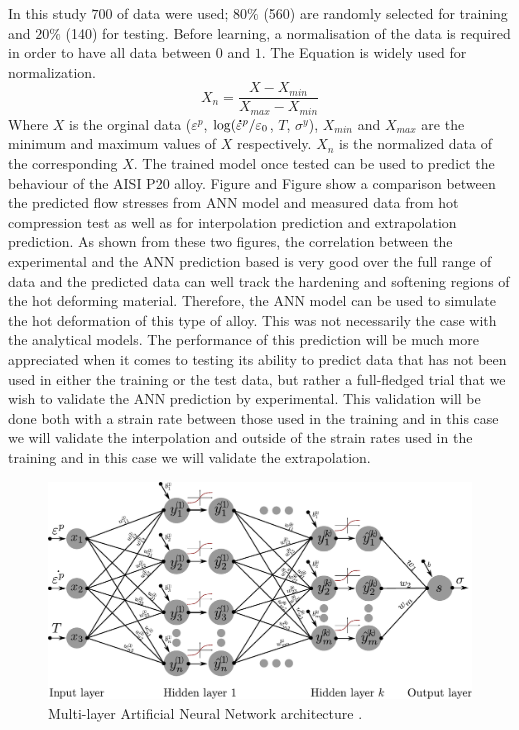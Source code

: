 \documentclass[twoside,english,1p,final,sort&compress]{elsarticle}
\theoremstyle{plain}
\newcommand{\mdot}[1]{\accentset{\mbox{\bfseries .}}{#1}}
\begin{document}
In this study $700$ of data were used; $80\%$ (560) are randomly selected for training and $20\%$ (140) for testing. Before learning, a normalisation of the data is required in order to have all data between $0$ and $1$. The Equation is widely used for normalization.
\begin{equation}
X_n = \frac{X - X_{min}}{X_{max} - X_{min}}
\end{equation}
Where $X$ is the orginal data ($\varepsilon^p$, $\log(\mdot{\varepsilon}^p/\varepsilon_0$,  $T$, $\sigma^y$), $X_{min}$ and $X_{max}$ are the minimum and maximum values of $X$ respectively. $X_n$ is the normalized data of the corresponding $X$. The trained model once tested can be used to predict the behaviour of the AISI P20 alloy. Figure and Figure show a comparison between the predicted ﬂow stresses from ANN model and measured data from hot compression test as well as for interpolation prediction and extrapolation prediction. As shown from these two figures, the correlation between the experimental and the ANN prediction based is very good over the full range of data and the predicted data can well track the hardening and softening regions of the hot deforming material. Therefore, the ANN model can be used to simulate the hot deformation of this type of alloy. This was not necessarily the case with the analytical models. The performance of this prediction will be much more appreciated when it comes to testing its ability to predict data that has not been used in either the training or the test data, but rather a full-fledged trial that we wish to validate the ANN prediction by experimental. This validation will be done both with a strain rate between those used in the training and in this case we will validate the interpolation and outside of the strain rates used in the training and in this case we will validate the extrapolation.
\begin{figure}[!ht]
\centering
\includegraphics[width=0.9\columnwidth]
{newFigures/ANN-scheme-2HL}
\caption{Multi-layer Artificial Neural Network architecture \cite{OPantale-2021-LGP}.}
\label{fig:ANN-scheme-2HL}
\end{figure}
\end{document}
